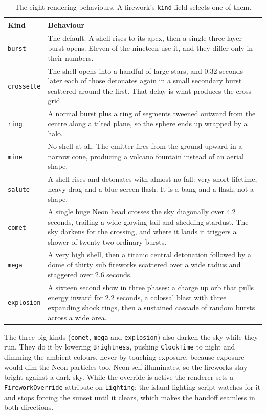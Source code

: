 \documentclass[12pt,letterpaper]{article}
\begin{document}
\begin{table}[H]
\centering
\footnotesize
\begin{tabular}{|p{2.2cm}|p{13.3cm}|}
\hline
\textbf{Kind} & \textbf{Behaviour} \\
\hline
\texttt{burst} & The default. A shell rises to its apex, then a single three layer burst opens. Eleven of the nineteen use it, and they differ only in their numbers. \\
\hline
\texttt{crossette} & The shell opens into a handful of large stars, and 0.32 seconds later each of those detonates again in a small secondary burst scattered around the first. That delay is what produces the cross grid. \\
\hline
\texttt{ring} & A normal burst plus a ring of segments tweened outward from the centre along a tilted plane, so the sphere ends up wrapped by a halo. \\
\hline
\texttt{mine} & No shell at all. The emitter fires from the ground upward in a narrow cone, producing a volcano fountain instead of an aerial shape. \\
\hline
\texttt{salute} & A shell rises and detonates with almost no fall: very short lifetime, heavy drag and a blue screen flash. It is a bang and a flash, not a shape. \\
\hline
\texttt{comet} & A single huge Neon head crosses the sky diagonally over 4.2 seconds, trailing a wide glowing tail and shedding stardust. The sky darkens for the crossing, and where it lands it triggers a shower of twenty two ordinary bursts. \\
\hline
\texttt{mega} & A very high shell, then a titanic central detonation followed by a dome of thirty sub fireworks scattered over a wide radius and staggered over 2.6 seconds. \\
\hline
\texttt{explosion} & A sixteen second show in three phases: a charge up orb that pulls energy inward for 2.2 seconds, a colossal blast with three expanding shock rings, then a sustained cascade of random bursts across a wide area. \\
\hline
\end{tabular}
\caption{The eight rendering behaviours. A firework's \texttt{kind} field selects one of them.}
\end{table}

The three big kinds (\texttt{comet}, \texttt{mega} and \texttt{explosion}) also darken the sky while they run. They do it by lowering \texttt{Brightness}, pushing \texttt{ClockTime} to night and dimming the ambient colours, never by touching exposure, because exposure would dim the Neon particles too. Neon self illuminates, so the fireworks stay bright against a dark sky. While the override is active the renderer sets a \texttt{FireworkOverride} attribute on \texttt{Lighting}; the island lighting script watches for it and stops forcing the sunset until it clears, which makes the handoff seamless in both directions.
\end{document}
